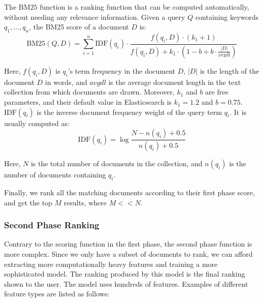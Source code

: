 The $\text{BM}25$ function \citep{robertson1996okapi} is a ranking function that can be computed automatically, without needing any relevance information. Given a query $Q$ containing keywords $q_1, ..., q_n$, the BM25 score of a document $D$ is:
\[ \text{BM}25(Q, D)=\sum _{i=1}^{n}{\text{IDF}}(q_{i})\cdot {\frac {f(q_{i},D)\cdot (k_{1}+1)}{f(q_{i},D)+k_{1}\cdot \left(1-b+b\cdot {\frac {|D|}{\text{avgdl}}}\right)}} \]

\noindent Here, $f(q_i, D)$ is $q_i$'s term frequency in the document $D$, $|D|$ is the length of the document $D$ in words, and $avgdl$ is the average document length in the text collection from which documents are drawn. Moreover, $k_1$ and $b$ are free parameters, and their default value in Elasticsearch is $k_1 = 1.2$ and $b = 0.75$. $\text{IDF}(q_i)$ is the inverse document frequency weight of the query term $q_i$. It is usually computed as:
\[ \text{IDF}(q_i) = \log \frac{N - n(q_i) + 0.5}{n(q_i) + 0.5} \]

\noindent Here, $N$ is the total number of documents in the collection, and $n(q_i)$ is the number of documents containing $q_i$.

Finally, we rank all the matching documents according to their first phase score, and get the top $M$ results, where $M << N$.

\subsubsection{Second Phase Ranking}
Contrary to the scoring function in the first phase, the second phase function is more complex. Since we only have a subset of documents to rank, we can afford extracting more computationally heavy features and training a more sophisticated model. The ranking produced by this model is the final ranking shown to the user. The model uses hundreds of features. Examples of different feature types are listed as follows:

